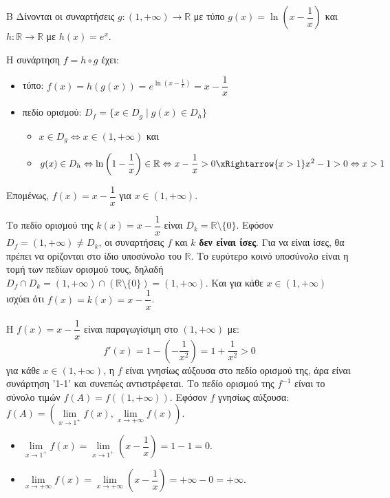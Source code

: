 \begin{thema}{Β}
Δίνονται οι συναρτήσεις $g:(1,+\infty)\to\mathbb{R}$ με τύπο $g(x)=\ln\left(x-\dfrac{1}{x}\right)$ και $h:\mathbb{R}\to\mathbb{R}$ με $h(x)=e^x$.

\begin{erwthma}
\item Η συνάρτηση $f=h\circ g$ έχει:
\begin{itemize}
\item τύπο: $f(x) = h(g(x)) = e^{\ln(x-\frac{1}{x})} = x - \dfrac{1}{x}$
\item πεδίο ορισμού: $D_f = \{x\in D_g \mid g(x)\in D_h\}$
\begin{itemize}[label=\tiny\faPlay]
\item $x\in D_g\Leftrightarrow x\in(1,+\infty)$ και 
\item $g(x)\in D_h\Leftrightarrow \ln{\left(1-\dfrac{1}{x}\right)}\in\mathbb{R}\Leftrightarrow x-\dfrac{1}{x}>0\xRightarrow{x>1}x^2-1>0\Leftrightarrow x>1$
\end{itemize}
\end{itemize}
Επομένως, $f(x) = x - \dfrac{1}{x}$ για $x \in (1, +\infty)$.

\item Το πεδίο ορισμού της $k(x) = x - \dfrac{1}{x}$ είναι $D_k = \mathbb{R} \setminus \{0\}$.
Εφόσον $D_f = (1, +\infty) \ne D_k$, οι συναρτήσεις $f$ και $k$ \textbf{δεν είναι ίσες}.
Για να είναι ίσες, θα πρέπει να ορίζονται στο ίδιο υποσύνολο του $\mathbb{R}$. Το ευρύτερο κοινό υποσύνολο είναι η τομή των πεδίων ορισμού τους, δηλαδή $D_f \cap D_k = (1, +\infty) \cap (\mathbb{R} \setminus \{0\}) = (1, +\infty)$.
Και για κάθε $x \in (1, +\infty)$ ισχύει ότι $f(x) = k(x) = x - \dfrac{1}{x}$.

\item Η $f(x) = x - \dfrac{1}{x}$ είναι παραγωγίσιμη στο $(1, +\infty)$ με:
\[f'(x) = 1 - \left(-\dfrac{1}{x^2}\right) = 1 + \dfrac{1}{x^2}>0\]
για κάθε $x \in (1, +\infty)$, η $f$ είναι γνησίως αύξουσα στο πεδίο ορισμού της, άρα είναι συνάρτηση '1-1' και συνεπώς αντιστρέφεται. Το πεδίο ορισμού της $f^{-1}$ είναι το σύνολο τιμών $f(A) = f((1, +\infty))$. Εφόσον $f$ γνησίως αύξουσα:
$f(A) = \left( \lim\limits_{x\to1^+} f(x), \lim\limits_{x\to+\infty} f(x) \right)$.

\begin{itemize}
\item $\lim\limits_{x\to1^+} f(x) = \lim\limits_{x\to1^+} \left(x - \dfrac{1}{x}\right) = 1 - 1 = 0$.
\item $\lim\limits_{x\to+\infty} f(x) = \lim\limits_{x\to+\infty} \left(x - \dfrac{1}{x}\right) = +\infty - 0 = +\infty$.
\end{itemize}


\end{erwthma}
\end{thema}
